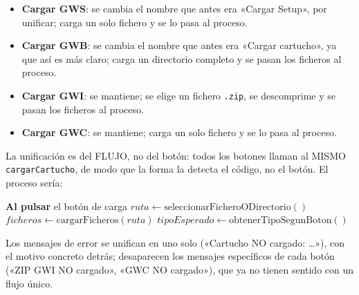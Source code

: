 \begin{itemize}
	\item \textbf{Cargar GWS}: se cambia el nombre que antes era 
	«Cargar Setup», por unificar; carga un solo fichero y
	se lo pasa al proceso.
	
	\item \textbf{Cargar GWB}: se cambia el nombre que antes era
	«Cargar cartucho», ya que así es más claro; carga un directorio
	completo y se pasan los ficheros al proceso.
	
	\item \textbf{Cargar GWI}: se mantiene; se elige un fichero
	\texttt{.zip}, se descomprime y se pasan los ficheros al proceso.
	
	\item \textbf{Cargar GWC}: se mantiene; carga un solo fichero y
	se lo pasa al proceso.
\end{itemize}

La unificación es del FLUJO, no del botón: todos los botones llaman al
MISMO \texttt{cargarCartucho}, de modo que la forma la detecta el
código, no el botón. El proceso sería:


\begin{algorithm}[H]
	\caption{Flujo de selección y validación de carga del cartucho}
	\label{alg:carga_cartucho}
	
	
	\BlankLine
	\textbf{Al pulsar} el botón de carga\;
		$ruta \leftarrow \text{seleccionarFicheroODirectorio}()$\;
		$ficheros \leftarrow \text{cargarFicheros}(ruta)$\;
		$tipoEsperado \leftarrow \text{obtenerTipoSegunBoton}()$\;
	\BlankLine
	\BlankLine
\end{algorithm}


Los mensajes de error se unifican en uno solo («Cartucho NO cargado:
\dots»), con el motivo concreto detrás; desaparecen los mensajes
específicos de cada botón («ZIP GWI NO cargado», «GWC NO cargado»),
que ya no tienen sentido con un flujo único.

